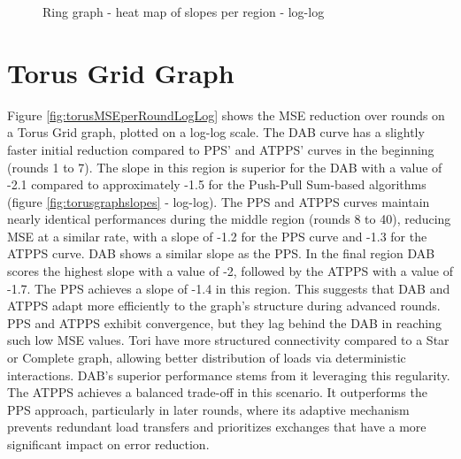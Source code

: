 \begin{figure}
    \centering
    \caption{Ring graph - heat map of slopes per region - log-log}
    \label{fig:ringgraphslopes}
\end{figure}

\section{Torus Grid Graph}\label{sec:torusgridGraph}
Figure \ref{fig:torusMSEperRoundLogLog} shows the MSE reduction over rounds on a Torus Grid graph, plotted on a log-log scale. The DAB curve has a slightly faster initial reduction compared to PPS' and ATPPS' curves in the beginning (rounds 1 to 7). The slope in this region is superior for the DAB with a value of -2.1 compared to approximately -1.5 for the Push-Pull Sum-based algorithms (figure \ref{fig:torusgraphslopes} - log-log). The PPS and ATPPS curves maintain nearly identical performances during the middle region (rounds 8 to 40), reducing MSE at a similar rate, with a slope of -1.2 for the PPS curve and -1.3 for the ATPPS curve. DAB shows a similar slope as the PPS. In the final region DAB scores the highest slope with a value of -2, followed by the ATPPS with a value of -1.7. The PPS achieves a slope of -1.4 in this region. This suggests that DAB and ATPPS adapt more efficiently to the graph's structure during advanced rounds. PPS and ATPPS exhibit convergence, but they lag behind the DAB in reaching such low MSE values. Tori have more structured connectivity compared to a Star or Complete graph, allowing better distribution of loads via deterministic interactions. DAB's superior performance stems from it leveraging this regularity. The ATPPS achieves a balanced trade-off in this scenario. It outperforms the PPS approach, particularly in later rounds, where its adaptive mechanism prevents redundant load transfers and prioritizes exchanges that have a more significant impact on error reduction.

